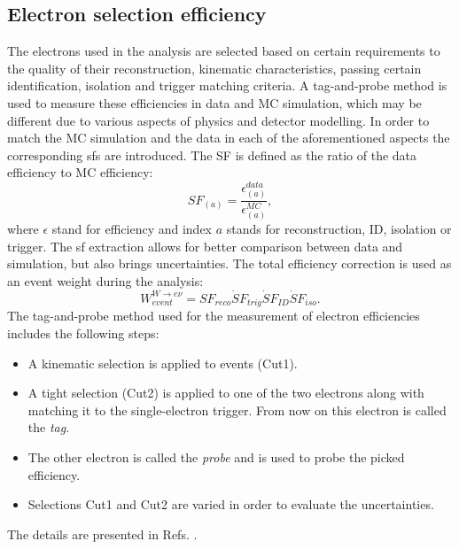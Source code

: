     \subsection{Electron selection efficiency}
    The electrons used in the analysis are selected based on certain requirements to the quality of their reconstruction, kinematic characteristics, passing certain identification, isolation and trigger matching criteria. A tag-and-probe method is used to measure these efficiencies in data and MC simulation, which may be different due to various aspects of physics and detector modelling. In order to match the MC simulation and the data in each of the aforementioned aspects the corresponding \gls{sf}s are introduced. The SF is defined as the ratio of the data efficiency to MC efficiency:
     \begin{equation*}
     SF_{(a)}=\frac{\epsilon^{data}_{(a)}}{\epsilon^{MC}_{(a)}},
     \end{equation*}
     where $\epsilon$ stand for efficiency and index $a$ stands for reconstruction, ID, isolation or trigger. The \gls{sf} extraction allows for better comparison between data and simulation, but also brings uncertainties. The total efficiency correction is used as an event weight during the analysis:
     \begin{equation*}
     W_{event}^{W\rightarrow e\nu}=SF_{reco} \dot SF_{trig} \dot SF_{ID} \dot SF_{iso}.
     \end{equation*}
     The tag-and-probe method used for the measurement of electron efficiencies includes the following steps:
     \begin{itemize}
     	\item A kinematic selection is applied to \Zee events (Cut1).
     	\item A tight selection (Cut2) is applied to one of the two electrons along with matching it to the single-electron trigger. From now on this electron is called the \textit{tag}.
     	\item The other electron is called the \textit{probe} and is used to probe the picked efficiency.
     	\item Selections Cut1 and Cut2 are varied in order to evaluate the uncertainties. 
     \end{itemize}
 	The details are presented in Refs. \cite{Aaboud:2018ugz, electrons_reco1, topoclust_2019}.
